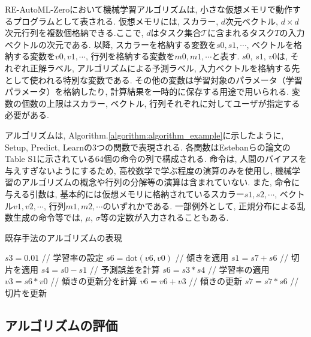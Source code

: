\documentclass[a4paper,11pt,twocolumn]{jarticle}
\begin{document}
RE-AutoML-Zeroにおいて機械学習アルゴリズムは, 小さな仮想メモリで動作するプログラムとして表される. 仮想メモリには, スカラー, $d$次元ベクトル, $d \times d$次元行列を複数個格納できる.ここで, $d $はタスク集合$\mathcal{T}$に含まれるタスク$T$の入力ベクトルの次元である. 以降, スカラーを格納する変数を$s0,s1,\cdots$, ベクトルを格納する変数を$v0,v1,\cdots$, 行列を格納する変数を$m0,m1,\cdots$と表す. $s0$, $s1$, $v0$は, それぞれ正解ラベル, アルゴリズムによる予測ラベル, 入力ベクトルを格納する先として使われる特別な変数である. その他の変数は学習対象のパラメータ（学習パラメータ）を格納したり, 計算結果を一時的に保存する用途で用いられる. 変数の個数の上限はスカラー, ベクトル, 行列それぞれに対してユーザが指定する必要がある.

アルゴリズムは, Algorithm.\ref{algorithm:algorithm_example}に示したように, Setup, Predict, Learnの3つの関数で表現される. 各関数はEstebanらの論文\cite{automl_zero}のTable S1に示されている64個の命令の列で構成される. 命令は, 人間のバイアスを与えすぎないようにするため, 高校数学で学ぶ程度の演算のみを使用し, 機械学習のアルゴリズムの概念や行列の分解等の演算は含まれていない. また, 命令に与える引数は, 基本的には仮想メモリに格納されているスカラー$s1,s2,\cdots$, ベクトル$v1,v2,\cdots$, 行列$m1,m2,\cdots$のいずれかである. 一部例外として, 正規分布による乱数生成の命令等では, $\mu$, $\sigma$等の定数が入力されることもある.

\begin{algorithm}[tb]
  \caption{既存手法のアルゴリズムの表現}
  \label{algorithm:algorithm_example}
  \begin{algorithmic}[1]
    \State $s3 = 0.01$ // 学習率の設定
    \EndFunction
    \State $s6 = \mathrm{dot}(v6, v0)$ // 傾きを適用
    \State $s1 = s7 + s6$ // 切片を適用
    \EndFunction
    \State $s4 = s0 - s1$ // 予測誤差を計算
    \State $s6 = s3 * s4$ // 学習率の適用
    \State $v3 = s6 * v0$ // 傾きの更新分を計算
    \State $v6 = v6 + v3$ // 傾きの更新
    \State $s7 = s7 * s6$ // 切片を更新
    \EndFunction
  \end{algorithmic}
\end{algorithm}

\subsection{アルゴリズムの評価}\label{subsec:existing_problem:algorithm_eval}
\end{document}
